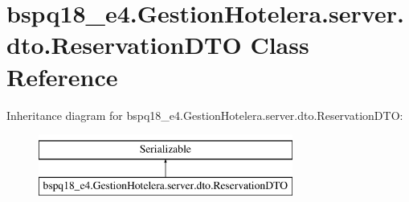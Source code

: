 \hypertarget{classbspq18__e4_1_1_gestion_hotelera_1_1server_1_1dto_1_1_reservation_d_t_o}{}\section{bspq18\+\_\+e4.\+Gestion\+Hotelera.\+server.\+dto.\+Reservation\+D\+TO Class Reference}
\label{classbspq18__e4_1_1_gestion_hotelera_1_1server_1_1dto_1_1_reservation_d_t_o}
Inheritance diagram for bspq18\+\_\+e4.\+Gestion\+Hotelera.\+server.\+dto.\+Reservation\+D\+TO\+:\begin{figure}[H]
\begin{center}
\leavevmode
\includegraphics[height=2.000000cm]{classbspq18__e4_1_1_gestion_hotelera_1_1server_1_1dto_1_1_reservation_d_t_o}
\end{center}
\end{figure}
